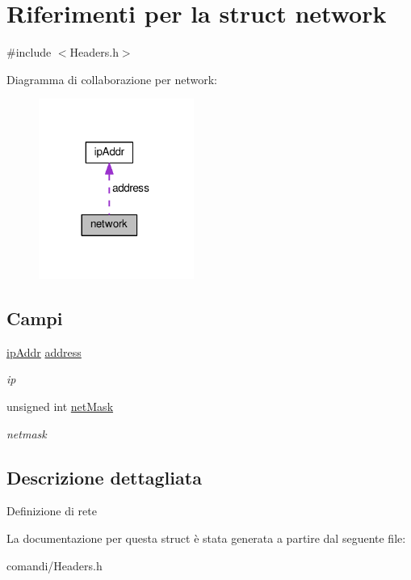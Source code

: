 \hypertarget{structnetwork}{}\section{Riferimenti per la struct network}
\label{structnetwork}


{\ttfamily \#include $<$Headers.\+h$>$}



Diagramma di collaborazione per network\+:\nopagebreak
\begin{figure}[H]
\begin{center}
\leavevmode
\includegraphics[width=144pt]{structnetwork__coll__graph}
\end{center}
\end{figure}
\subsection*{Campi}
\begin{DoxyCompactItemize}
\item 
\hyperlink{unionipAddr}{ip\+Addr} \hyperlink{structnetwork_aadfdf4cd8bd0c69641dbbdcc6376bb10}{address}\hypertarget{structnetwork_aadfdf4cd8bd0c69641dbbdcc6376bb10}{}\label{structnetwork_aadfdf4cd8bd0c69641dbbdcc6376bb10}

\begin{DoxyCompactList}\small\item\em ip \end{DoxyCompactList}\item 
unsigned int \hyperlink{structnetwork_a4b43d7f804814ac38a81108cfc538969}{net\+Mask}\hypertarget{structnetwork_a4b43d7f804814ac38a81108cfc538969}{}\label{structnetwork_a4b43d7f804814ac38a81108cfc538969}

\begin{DoxyCompactList}\small\item\em netmask \end{DoxyCompactList}\end{DoxyCompactItemize}


\subsection{Descrizione dettagliata}
Definizione di rete 

La documentazione per questa struct è stata generata a partire dal seguente file\+:\begin{DoxyCompactItemize}
\item 
comandi/Headers.\+h\end{DoxyCompactItemize}
